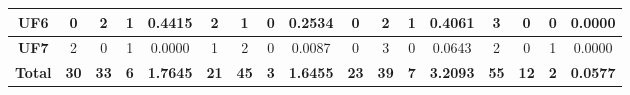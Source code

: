 \begin{table*}[t]
{\begin{tabular}{c|c|c|c|c|c|c|c|c|c|c|c|c|c|c|c|c|}
\multicolumn{1}{|c|}{\textbf{UF6}}   & 0                   & 2                     & 1                          & 0.4415          & 2                   & 1                     & 0                          & 0.2534          & 0                   & 2                     & 1                          & 0.4061          & 3                   & 0                     & 0                          & 0.0000          \\ \hline
\multicolumn{1}{|c|}{\textbf{UF7}}   & 2                   & 0                     & 1                          & 0.0000          & 1                   & 2                     & 0                          & 0.0087          & 0                   & 3                     & 0                          & 0.0643          & 2                   & 0                     & 1                          & 0.0000          \\ \hline
\multicolumn{1}{|c|}{\textbf{Total}} & \textbf{30}         & \textbf{33}           & \textbf{6}                 & \textbf{1.7645} & \textbf{21}         & \textbf{45}           & \textbf{3}                 & \textbf{1.6455} & \textbf{23}         & \textbf{39}           & \textbf{7}                 & \textbf{3.2093} & \textbf{55}         & \textbf{12}           & \textbf{2}                 & \textbf{0.0577} \\ \hline
\end{tabular}%
}
\end{table*}

